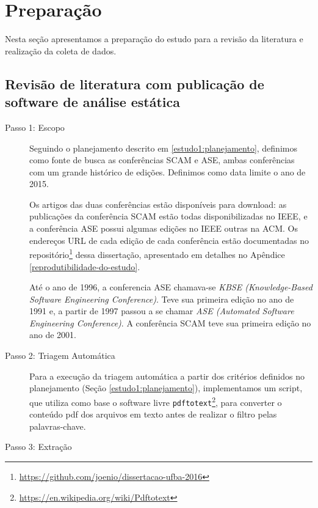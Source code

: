 
\section{Preparação} \label{estudo1:preparacao} %

Nesta seção apresentamos a preparação do estudo para a revisão da literatura
e realização da coleta de
dados.

\subsection{Revisão de literatura com publicação de software de análise estática}

\begin{description}
  \item [Passo 1: Escopo]

Seguindo o planejamento descrito em \ref{estudo1:planejamento}, definimos como
fonte de busca as conferências SCAM e ASE, ambas conferências com um grande
histórico de edições. Definimos como data limite o ano de 2015.

Os artigos das duas conferências estão disponíveis para download:
as publicações da conferência SCAM estão todas disponibilizadas no IEEE, e
a conferência ASE possui algumas edições no IEEE outras na ACM. Os endereços URL
de cada edição de cada conferência estão documentadas no
repositório\footnote{\url{https://github.com/joenio/dissertacao-ufba-2016}}
dessa dissertação, apresentado em detalhes no Apêndice
\ref{reprodutibilidade-do-estudo}.

Até o ano de 1996, a conferencia ASE chamava-se {\it KBSE (Knowledge-Based Software
Engineering Conference)}. Teve sua primeira edição no ano de 1991 e, a partir de 1997 
passou a se chamar {\it ASE (Automated Software Engineering Conference)}.
A conferência SCAM teve sua primeira edição no ano de 2001.

  \item [Passo 2: Triagem Automática]

Para a execução da triagem automática a partir dos
critérios definidos no planejamento (Seção \ref{estudo1:planejamento}),
implementamos um script, que utiliza como base o software livre
\texttt{pdftotext}\footnote{\url{https://en.wikipedia.org/wiki/Pdftotext}}, para
converter o conteúdo pdf dos arquivos em texto antes de realizar o filtro pelas
palavras-chave.

  \item [Passo 3: Extração]


\end{description}

